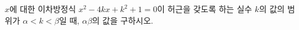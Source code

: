 \hspace*{2mm}\begin{minipage}[t]{\dimexpr\linewidth-2mm\relax}\vspace{0pt}
$x$에 대한 이차방정식 $x^2-4kx+k^2+1=0$이 허근을 갖도록 하는 실수 $k$의 값의 범위가 $\alpha<k<\beta$일 때, $\alpha\beta$의 값을 구하시오.\end{minipage}

